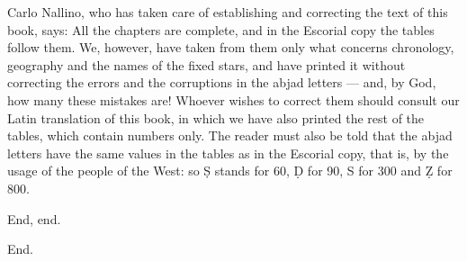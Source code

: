 Carlo Nallino, who has taken care of establishing and correcting the text of this book, says: All the chapters are complete, and in the Escorial copy the tables follow them. We, however, have taken from them only what concerns chronology, geography and the names of the fixed stars, and have printed it without correcting the errors and the corruptions in the abjad letters — and, by God, how many these mistakes are! Whoever wishes to correct them should consult our Latin translation of this book, in which we have also printed the rest of the tables, which contain numbers only. The reader must also be told that the abjad letters have the same values in the tables as in the Escorial copy, that is, by the usage of the people of the West: so Ṣ stands for 60, Ḍ for 90, S for 300 and Ẓ for 800.\par{\centering End, end.\par}\par{\centering End.\par}

\par{}\bigskip{}\nobreak\medskip

